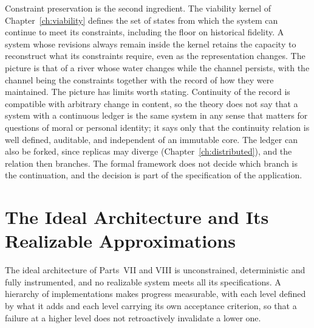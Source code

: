 Constraint preservation is the second ingredient. The viability kernel of Chapter~\ref{ch:viability} defines the set of states from which the system can continue to meet its constraints, including the floor on historical fidelity. A system whose revisions always remain inside the kernel retains the capacity to reconstruct what its constraints require, even as the representation changes. The picture is that of a river whose water changes while the channel persists, with the channel being the constraints together with the record of how they were maintained. The picture has limits worth stating. Continuity of the record is compatible with arbitrary change in content, so the theory does not say that a system with a continuous ledger is the same system in any sense that matters for questions of moral or personal identity; it says only that the continuity relation is well defined, auditable, and independent of an immutable core. The ledger can also be forked, since replicas may diverge (Chapter~\ref{ch:distributed}), and the relation then branches. The formal framework does not decide which branch is the continuation, and the decision is part of the specification of the application.

\chapter{The Ideal Architecture and Its Realizable Approximations}\label{ch:hierarchy}

The ideal architecture of Parts~VII and VIII is unconstrained, deterministic and fully instrumented, and no realizable system meets all its specifications. A hierarchy of implementations makes progress measurable, with each level defined by what it adds and each level carrying its own acceptance criterion, so that a failure at a higher level does not retroactively invalidate a lower one.

